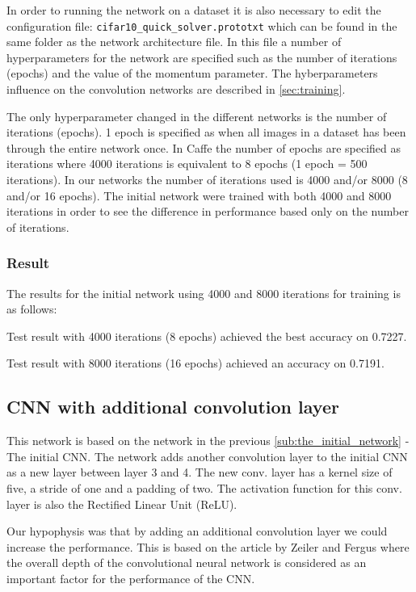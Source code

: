In order to running the network on a dataset it is also necessary to edit the
configuration file: \verb|cifar10_quick_solver.prototxt| which can be found in
the same folder as the network architecture file. In this file a number of
hyperparameters for the network are specified such as the number of iterations
(epochs) and the value of the momentum parameter. The hyberparameters influence
on the convolution networks are described in \autoref{sec:training}.


The only hyperparameter changed in the different networks is the number of
iterations (epochs). 1 epoch is specified as when all images in a dataset has
been through the entire network once. In Caffe the number of epochs are
specified as iterations where 4000 iterations is equivalent to 8 epochs (1
epoch = 500 iterations).
In our networks the number of iterations used is 4000 and/or 8000 (8 and/or 16
epochs). The initial network were trained with both 4000 and 8000 iterations in
order to see the difference in performance based only on the number of
iterations.


\subsubsection{Result}

The results for the initial network using 4000 and 8000 iterations for training
is as follows: 

Test result with 4000 iterations (8 epochs) achieved the best accuracy on 0.7227.   

Test result with 8000 iterations (16 epochs) achieved an accuracy on 0.7191. 



\subsection{CNN with additional convolution layer} %
\label{sub:cnn}

This network is based on the network in the previous
\autoref{sub:the_initial_network} - The initial CNN. The network adds another
convolution layer to the initial CNN as a new layer between layer 3 and 4. The
new conv. layer has a kernel size of five, a stride of one and a padding of two.
The activation function for this conv. layer is also the Rectified Linear Unit
(ReLU). 

Our hypophysis was that by adding an additional convolution layer we could
increase the performance. This is based on the article by Zeiler and
Fergus\cite{ZeilerFergus} where the overall depth of the convolutional neural
network is considered as an important factor for the performance of the CNN. 


